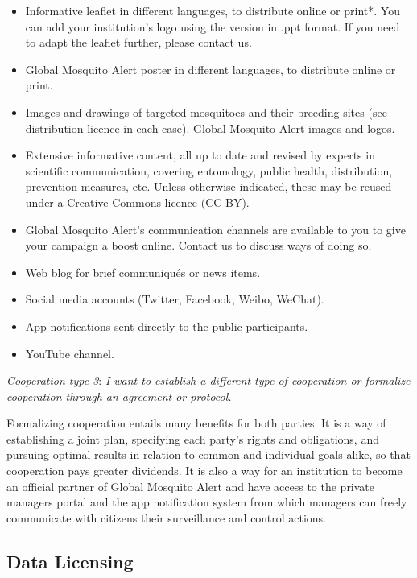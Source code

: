 \documentclass[]{article}
\providecommand{\tightlist}{%
  \setlength{\itemsep}{0pt}\setlength{\parskip}{0pt}}
\begin{document}
\begin{itemize}
\tightlist
\item
  Informative leaflet in different languages, to distribute online or print*. You can add your institution's logo using the version in .ppt format. If you need to adapt the leaflet further, please contact us.
\item
  Global Mosquito Alert poster in different languages, to distribute online or print.
\item
  Images and drawings of targeted mosquitoes and their breeding sites (see distribution licence in each case). Global Mosquito Alert images and logos.
\item
  Extensive informative content, all up to date and revised by experts in scientific communication, covering entomology, public health, distribution, prevention measures, etc. Unless otherwise indicated, these may be reused under a Creative Commons licence (CC BY).
\item
  Global Mosquito Alert's communication channels are available to you to give your campaign a boost online. Contact us to discuss ways of doing so.
\item
  Web blog for brief communiqués or news items.
\item
  Social media accounts (Twitter, Facebook, Weibo, WeChat).
\item
  App notifications sent directly to the public participants.
\item
  YouTube channel.
\end{itemize}

\emph{Cooperation type 3}: \emph{I want to establish a different type of cooperation or formalize cooperation through an agreement or protocol.}

Formalizing cooperation entails many benefits for both parties. It is a way of establishing a joint plan, specifying each party's rights and obligations, and pursuing optimal results in relation to common and individual goals alike, so that cooperation pays greater dividends. It is also a way for an institution to become an official partner of Global Mosquito Alert and have access to the private managers portal and the app notification system from which managers can freely communicate with citizens their surveillance and control actions.

\hypertarget{data-licensing}{%
\subsection{Data Licensing}\label{data-licensing}}
\end{document}
